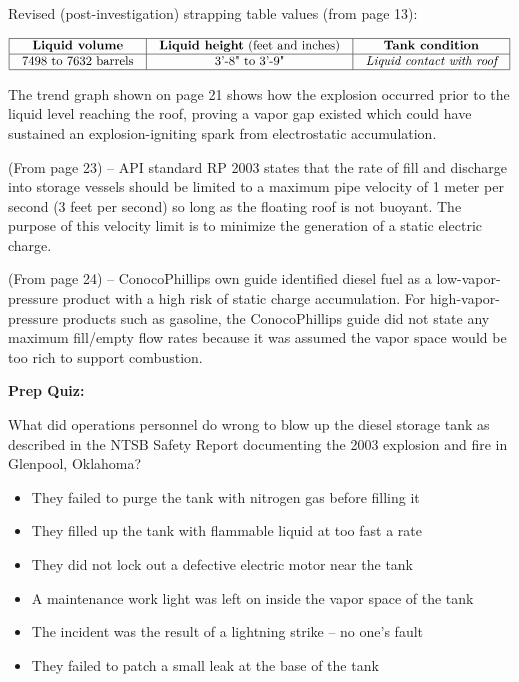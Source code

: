 \vskip 30pt

Revised (post-investigation) strapping table values (from page 13):


$$\vbox{\offinterlineskip
\halign{\strut
\vrule \quad\hfil # \ \hfil & 
\vrule \quad\hfil # \ \hfil & 
\vrule \quad\hfil # \ \hfil \vrule \cr
\noalign{\hrule}
%
{\bf Liquid volume} & {\bf Liquid height} (feet and inches) & {\bf Tank condition} \cr
%
\noalign{\hrule}
%
7498 to 7632 barrels & 3'-8" to 3'-9" & {\it Liquid contact with roof} \cr
%
\noalign{\hrule}
} %
}$$ %

The trend graph shown on page 21 shows how the explosion occurred prior to the liquid level reaching the roof, proving a vapor gap existed which could have sustained an explosion-igniting spark from electrostatic accumulation.

\vskip 10pt

(From page 23) -- API standard RP 2003 states that the rate of fill and discharge into storage vessels should be limited to a maximum pipe velocity of 1 meter per second (3 feet per second) so long as the floating roof is not buoyant.  The purpose of this velocity limit is to minimize the generation of a static electric charge.

\vskip 10pt

(From page 24) -- ConocoPhillips own guide identified diesel fuel as a low-vapor-pressure product with a high risk of static charge accumulation.  For high-vapor-pressure products such as gasoline, the ConocoPhillips guide did not state any maximum fill/empty flow rates because it was assumed the vapor space would be too rich to support combustion.





\vfil \eject

\noindent
{\bf Prep Quiz:}

What did operations personnel do wrong to blow up the diesel storage tank as described in the NTSB Safety Report documenting the 2003 explosion and fire in Glenpool, Oklahoma?

\begin{itemize}
\item{} They failed to purge the tank with nitrogen gas before filling it 
\vskip 5pt 
\item{} They filled up the tank with flammable liquid at too fast a rate
\vskip 5pt 
\item{} They did not lock out a defective electric motor near the tank
\vskip 5pt 
\item{} A maintenance work light was left on inside the vapor space of the tank
\vskip 5pt 
\item{} The incident was the result of a lightning strike -- no one's fault
\vskip 5pt 
\item{} They failed to patch a small leak at the base of the tank
\end{itemize}




